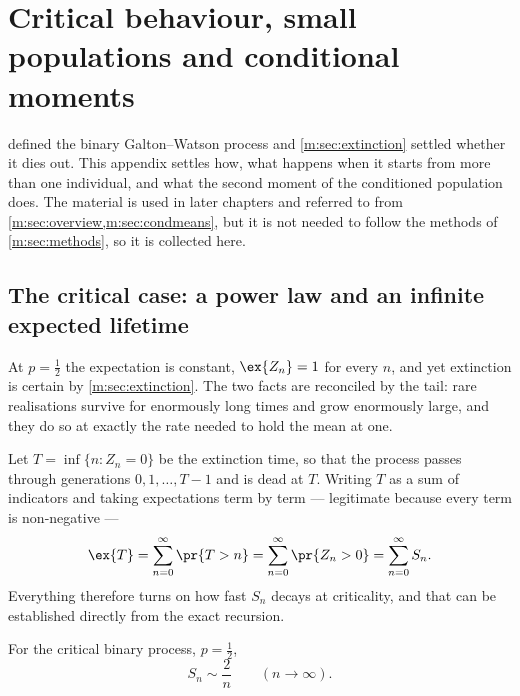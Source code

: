 \renewcommand{\thesection}{\thechapter.\Alph{section}}
\setcounter{section}{0}

\section{Critical behaviour, small populations and conditional moments}
\label{m:app:criticalgw}

 defined the binary Galton--Watson process and
\cref{m:sec:extinction} settled whether it dies out. This appendix settles how, what
happens when it starts from more than one individual, and what the second moment of
the conditioned population does. The material is used in later chapters and referred
to from \cref{m:sec:overview,m:sec:condmeans}, but it is not needed to follow the
methods of \cref{m:sec:methods}, so it is collected here.

\subsection{The critical case: a power law and an infinite expected lifetime}
\label{m:app:critical}

At $p=\tfrac12$ the expectation is constant, $\ex{Z_n}=1$ for every $n$, and yet
extinction is certain by \cref{m:sec:extinction}. The two facts are reconciled by
the tail: rare realisations survive for enormously long times and grow enormously
large, and they do so at exactly the rate needed to hold the mean at one.

Let $T=\inf\{n:Z_n=0\}$ be the extinction time, so that the process passes through
generations $0,1,\dots,T-1$ and is dead at $T$. Writing $T$ as a sum of indicators
and taking expectations term by term --- legitimate because every term is
non-negative ---
\begin{equation}
\label{m:eq:ETsumSn}
\ex{T} = \sum_{n=0}^{\infty}\pr{T>n} = \sum_{n=0}^{\infty}\pr{Z_n>0}
= \sum_{n=0}^{\infty}S_n .
\end{equation}
Everything therefore turns on how fast $S_n$ decays at criticality, and that can be
established directly from the exact recursion.

\begin{proposition}
\label{m:prop:criticalSn}
For the critical binary process, $p=\tfrac12$,
\begin{equation}
\label{m:eq:twoovern}
S_n\sim\frac{2}{n}\qquad(n\to\infty).
\end{equation}
\end{proposition}

